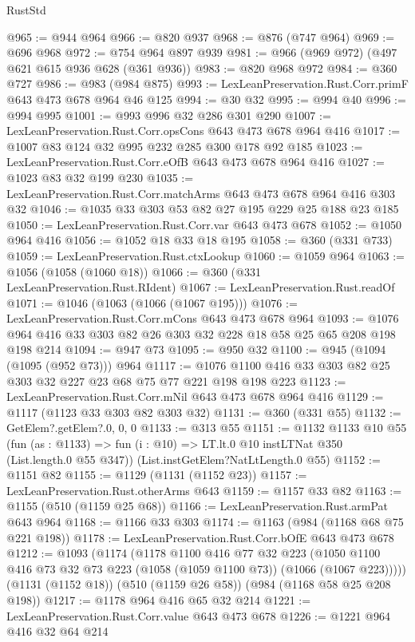 \begin{lexlean}{RustStd}
\begin{coremodule}
@965 := @944 @964
@966 := @820 @937
@968 := @876 (@747 @964)
@969 := @696 @968
@972 := @754 @964 @897 @939
@981 := @966 (@969 @972) (@497 @621 @615 @936 @628 (@361 @936))
@983 := @820 @968 @972
@984 := @360 @727
@986 := @983 (@984 @875)
@993 := LexLeanPreservation.Rust.Corr.primF @643 @473 @678 @964 @46 @125
@994 := @30 @32
@995 := @994 @40
@996 := @994 @995
@1001 := @993 @996 @32 @286 @301 @290
@1007 := LexLeanPreservation.Rust.Corr.opsCons @643 @473 @678 @964 @416
@1017 := @1007 @83 @124 @32 @995 @232 @285 @300 @178 @92 @185
@1023 := LexLeanPreservation.Rust.Corr.eOfB @643 @473 @678 @964 @416
@1027 := @1023 @83 @32 @199 @230
@1035 := LexLeanPreservation.Rust.Corr.matchArms @643 @473 @678 @964 @416 @303 @32
@1046 := @1035 @33 @303 @53 @82 @27 @195 @229 @25 @188 @23 @185
@1050 := LexLeanPreservation.Rust.Corr.var @643 @473 @678
@1052 := @1050 @964 @416
@1056 := @1052 @18 @33 @18 @195
@1058 := @360 (@331 @733)
@1059 := LexLeanPreservation.Rust.ctxLookup
@1060 := @1059 @964
@1063 := @1056 (@1058 (@1060 @18))
@1066 := @360 (@331 LexLeanPreservation.Rust.RIdent)
@1067 := LexLeanPreservation.Rust.readOf
@1071 := @1046 (@1063 (@1066 (@1067 @195)))
@1076 := LexLeanPreservation.Rust.Corr.mCons @643 @473 @678 @964
@1093 := @1076 @964 @416 @33 @303 @82 @26 @303 @32 @228 @18 @58 @25 @65 @208 @198 @198 @214
@1094 := @947 @73
@1095 := @950 @32
@1100 := @945 (@1094 (@1095 (@952 @73))) @964
@1117 := @1076 @1100 @416 @33 @303 @82 @25 @303 @32 @227 @23 @68 @75 @77 @221 @198 @198 @223
@1123 := LexLeanPreservation.Rust.Corr.mNil @643 @473 @678 @964 @416
@1129 := @1117 (@1123 @33 @303 @82 @303 @32)
@1131 := @360 (@331 @55)
@1132 := GetElem?.getElem?.{0, 0, 0}
@1133 := @313 @55
@1151 := @1132
    @1133
    @10
    @55
    (fun (as : @1133) => fun (i : @10) => LT.lt.{0} @10 instLTNat @350 (List.length.{0} @55 @347))
    (List.instGetElem?NatLtLength.{0} @55)
@1152 := @1151 @82
@1155 := @1129 (@1131 (@1152 @23))
@1157 := LexLeanPreservation.Rust.otherArms @643
@1159 := @1157 @33 @82
@1163 := @1155 (@510 (@1159 @25 @68))
@1166 := LexLeanPreservation.Rust.armPat @643 @964
@1168 := @1166 @33 @303
@1174 := @1163 (@984 (@1168 @68 @75 @221 @198))
@1178 := LexLeanPreservation.Rust.Corr.bOfE @643 @473 @678
@1212 := @1093
    (@1174
      (@1178
        @1100
        @416
        @77
        @32
        @223
        (@1050 @1100 @416 @73 @32 @73 @223 (@1058 (@1059 @1100 @73)) (@1066 (@1067 @223)))))
    (@1131 (@1152 @18))
    (@510 (@1159 @26 @58))
    (@984 (@1168 @58 @25 @208 @198))
@1217 := @1178 @964 @416 @65 @32 @214
@1221 := LexLeanPreservation.Rust.Corr.value @643 @473 @678
@1226 := @1221 @964 @416 @32 @64 @214

\end{coremodule}
\end{lexlean}
